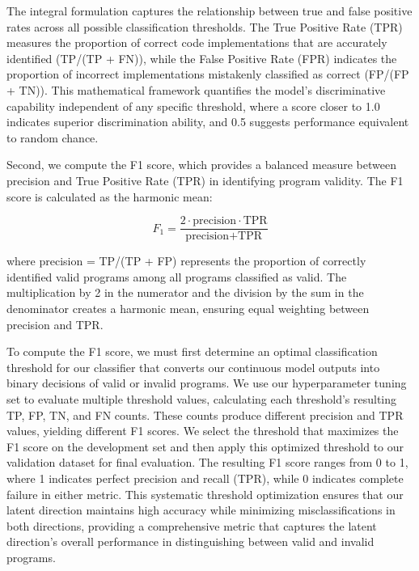 The integral formulation captures the relationship between true and false positive rates across all possible classification thresholds. The True Positive Rate (TPR) measures the proportion of correct code implementations that are accurately identified (TP/(TP + FN)), while the False Positive Rate (FPR) indicates the proportion of incorrect implementations mistakenly classified as correct (FP/(FP + TN)). This mathematical framework quantifies the model's discriminative capability independent of any specific threshold, where a score closer to 1.0 indicates superior discrimination ability, and 0.5 suggests performance equivalent to random chance.


Second, we compute the F1 score, which provides a balanced measure between precision and True Positive Rate (TPR) in identifying program validity. The F1 score is calculated as the harmonic mean:

\begin{equation}
F_1 = \frac{2 \cdot \text{precision} \cdot \text{TPR}}{\text{precision} + \text{TPR}}
\end{equation}

where precision = TP/(TP + FP) represents the proportion of correctly identified valid programs among all programs classified as valid. The multiplication by 2 in the numerator and the division by the sum in the denominator creates a harmonic mean, ensuring equal weighting between precision and TPR. 

To compute the F1 score, we must first determine an optimal classification threshold for our classifier that converts our continuous model outputs into binary decisions of valid or invalid programs. We use our hyperparameter tuning set to evaluate multiple threshold values, calculating each threshold's resulting TP, FP, TN, and FN counts. These counts produce different precision and TPR values, yielding different F1 scores. We select the threshold that maximizes the F1 score on the development set and then apply this optimized threshold to our validation dataset for final evaluation. The resulting F1 score ranges from 0 to 1, where 1 indicates perfect precision and recall (TPR), while 0 indicates complete failure in either metric. This systematic threshold optimization ensures that our latent direction maintains high accuracy while minimizing misclassifications in both directions, providing a comprehensive metric that captures the latent direction's overall performance in distinguishing between valid and invalid programs.


